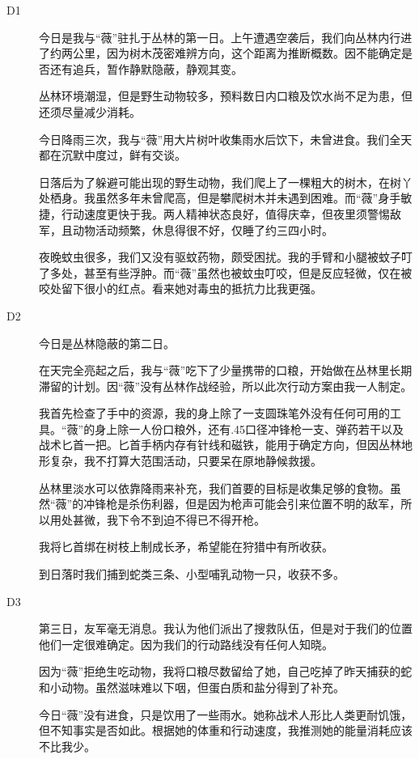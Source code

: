 \begin{description}
\item[D1]

今日是我与“薇”驻扎于丛林的第一日。上午遭遇空袭后，我们向丛林内行进了约两公里，因为树木茂密难辨方向，这个距离为推断概数。因不能确定是否还有追兵，暂作静默隐蔽，静观其变。

丛林环境潮湿，但是野生动物较多，预料数日内口粮及饮水尚不足为患，但还须尽量减少消耗。

今日降雨三次，我与“薇”用大片树叶收集雨水后饮下，未曾进食。我们全天都在沉默中度过，鲜有交谈。

日落后为了躲避可能出现的野生动物，我们爬上了一棵粗大的树木，在树丫处栖身。我虽然多年未曾爬高，但是攀爬树木并未遇到困难。而“薇”身手敏捷，行动速度更快于我。两人精神状态良好，值得庆幸，但夜里须警惕敌军，且动物活动频繁，休息得很不好，仅睡了约三四小时。

夜晚蚊虫很多，我们又没有驱蚊药物，颇受困扰。我的手臂和小腿被蚊子叮了多处，甚至有些浮肿。而“薇”虽然也被蚊虫叮咬，但是反应轻微，仅在被咬处留下很小的红点。看来她对毒虫的抵抗力比我更强。
\item[D2]

今日是丛林隐蔽的第二日。

在天完全亮起之后，我与“薇”吃下了少量携带的口粮，开始做在丛林里长期滞留的计划。因“薇”没有丛林作战经验，所以此次行动方案由我一人制定。

我首先检查了手中的资源，我的身上除了一支圆珠笔外没有任何可用的工具。“薇”的身上除一人份口粮外，还有.45口径冲锋枪一支、弹药若干以及战术匕首一把。匕首手柄内存有针线和磁铁，能用于确定方向，但因丛林地形复杂，我不打算大范围活动，只要呆在原地静候救援。

丛林里淡水可以依靠降雨来补充，我们首要的目标是收集足够的食物。虽然“薇”的冲锋枪是杀伤利器，但是因为枪声可能会引来位置不明的敌军，所以用处甚微，我下令不到迫不得已不得开枪。

我将匕首绑在树枝上制成长矛，希望能在狩猎中有所收获。

到日落时我们捕到蛇类三条、小型哺乳动物一只，收获不多。
\item[D3]

第三日，友军毫无消息。我认为他们派出了搜救队伍，但是对于我们的位置他们一定很难确定。因为我们的行动路线没有任何人知晓。

因为“薇”拒绝生吃动物，我将口粮尽数留给了她，自己吃掉了昨天捕获的蛇和小动物。虽然滋味难以下咽，但蛋白质和盐分得到了补充。

今日“薇”没有进食，只是饮用了一些雨水。她称战术人形比人类更耐饥饿，但不知事实是否如此。根据她的体重和行动速度，我推测她的能量消耗应该不比我少。


\end{description}
